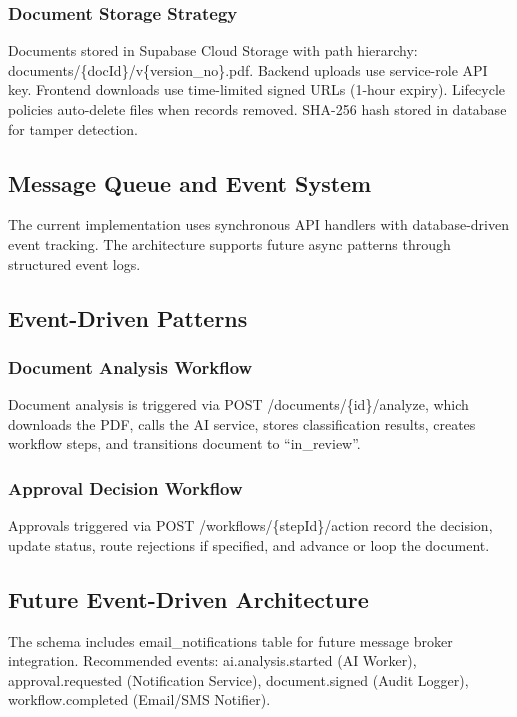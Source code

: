 \documentclass[12pt,oneside,openright,a4paper]{cpe-english-project}
\begin{document}
\subsubsection{Document Storage Strategy}

Documents stored in Supabase Cloud Storage with path hierarchy: documents/\{docId\}/v\{version\_no\}.pdf. Backend uploads use service-role API key. Frontend downloads use time-limited signed URLs (1-hour expiry). Lifecycle policies auto-delete files when records removed. SHA-256 hash stored in database for tamper detection.

\vspace{1em}

\subsection{Message Queue and Event System}

The current implementation uses synchronous API handlers with database-driven event tracking. The architecture supports future async patterns through structured event logs.

\subsection{Event-Driven Patterns}

\subsubsection{Document Analysis Workflow}

Document analysis is triggered via POST /documents/\{id\}/analyze, which downloads the PDF, calls the AI service, stores classification results, creates workflow steps, and transitions document to ``in\_review''.

\subsubsection{Approval Decision Workflow}

Approvals triggered via POST /workflows/\{stepId\}/action record the decision, update status, route rejections if specified, and advance or loop the document.

\subsection{Future Event-Driven Architecture}

The schema includes email\_notifications table for future message broker integration. Recommended events: ai.analysis.started (AI Worker), approval.requested (Notification Service), document.signed (Audit Logger), workflow.completed (Email/SMS Notifier).
\end{document}

